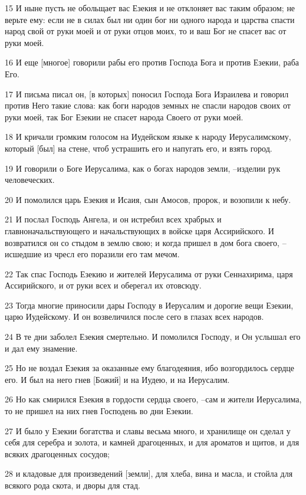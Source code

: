 \par 15 И ныне пусть не обольщает вас Езекия и не отклоняет вас таким образом; не верьте ему: если не в силах был ни один бог ни одного народа и царства спасти народ свой от руки моей и от руки отцов моих, то и ваш Бог не спасет вас от руки моей.
\par 16 И еще [многое] говорили рабы его против Господа Бога и против Езекии, раба Его.
\par 17 И письма писал он, [в которых] поносил Господа Бога Израилева и говорил против Него такие слова: как боги народов земных не спасли народов своих от руки моей, так Бог Езекии не спасет народа Своего от руки моей.
\par 18 И кричали громким голосом на Иудейском языке к народу Иерусалимскому, который [был] на стене, чтоб устрашить его и напугать его, и взять город.
\par 19 И говорили о Боге Иерусалима, как о богах народов земли, --изделии рук человеческих.
\par 20 И помолился царь Езекия и Исаия, сын Амосов, пророк, и возопили к небу.
\par 21 И послал Господь Ангела, и он истребил всех храбрых и главноначальствующего и начальствующих в войске царя Ассирийского. И возвратился он со стыдом в землю свою; и когда пришел в дом бога своего, --исшедшие из чресл его поразили его там мечом.
\par 22 Так спас Господь Езекию и жителей Иерусалима от руки Сеннахирима, царя Ассирийского, и от руки всех и оберегал их отовсюду.
\par 23 Тогда многие приносили дары Господу в Иерусалим и дорогие вещи Езекии, царю Иудейскому. И он возвеличился после сего в глазах всех народов.
\par 24 В те дни заболел Езекия смертельно. И помолился Господу, и Он услышал его и дал ему знамение.
\par 25 Но не воздал Езекия за оказанные ему благодеяния, ибо возгордилось сердце его. И был на него гнев [Божий] и на Иудею, и на Иерусалим.
\par 26 Но как смирился Езекия в гордости сердца своего, --сам и жители Иерусалима, то не пришел на них гнев Господень во дни Езекии.
\par 27 И было у Езекии богатства и славы весьма много, и хранилище он сделал у себя для серебра и золота, и камней драгоценных, и для ароматов и щитов, и для всяких драгоценных сосудов;
\par 28 и кладовые для произведений [земли], для хлеба, вина и масла, и стойла для всякого рода скота, и дворы для стад.
